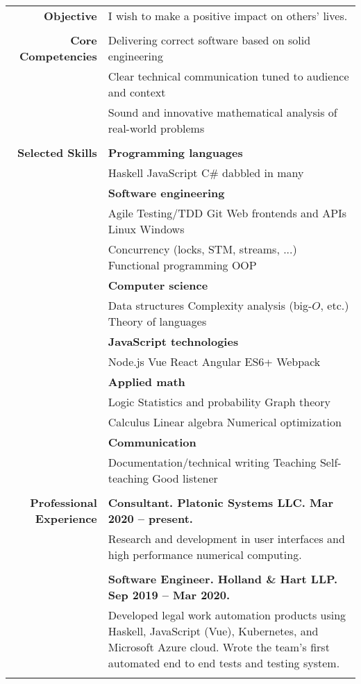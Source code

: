 \documentclass{article}
\newcommand\spc{\hspace{8pt}}
\begin{document}
\bgroup
\begin{tabular}{rl}
  \def\arraystrech{1.5}
  {\bf Objective} & I wish to make a positive impact on others' lives. \\ \\
  {\bf Core Competencies} & Delivering correct software based on solid engineering \\
   & Clear technical communication tuned to audience and context \\
  & Sound and innovative mathematical analysis of real-world problems \\ \\

  {\bf Selected Skills}  & {\bf Programming languages} \\
  & Haskell \spc JavaScript \spc C\# \spc dabbled in many \\
  & {\bf Software engineering} \\
  & Agile \spc Testing/TDD \spc Git \spc Web frontends and APIs \spc Linux \spc Windows \\
  & Concurrency (locks, STM, streams, ...) \spc Functional programming \spc OOP \\
  & {\bf Computer science} \\
  & Data structures \spc Complexity analysis (big-$O$, etc.) \spc Theory of languages \\
  & {\bf JavaScript technologies} \\
  & Node.js \spc Vue \spc React \spc Angular \spc ES6+ \spc Webpack \\
  & {\bf Applied math} \\
  & Logic \spc Statistics and probability \spc Graph theory \\
  & Calculus \spc Linear algebra \spc Numerical optimization \\
  & {\bf Communication} \\
  & Documentation/technical writing \spc Teaching \spc Self-teaching \spc Good listener \\ \\

  {\bf Professional Experience}
  & {\bf Consultant. Platonic Systems LLC. Mar 2020 -- present.}\\
  & \parbox{4.5in}{Research and development in user interfaces and high performance numerical computing.} \\ \\
  & {\bf Software Engineer. Holland \& Hart LLP. Sep 2019 -- Mar 2020.} \\
  & \parbox{4.5in}{Developed legal work automation products using Haskell, JavaScript (Vue), Kubernetes, and Microsoft Azure cloud. Wrote the team's first automated end to end tests and testing system.} \\ \\


\end{tabular}
\end{document}
